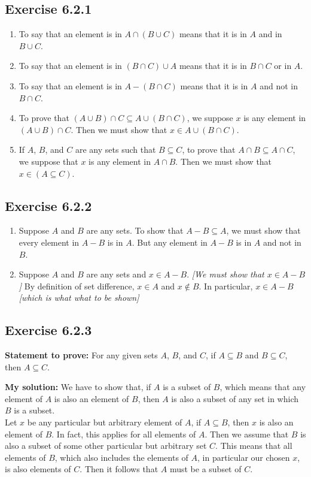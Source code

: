 \documentclass{article}
\newcommand{\In}{\! \in \!}
\newcommand{\Prove}{\textbf{Statement to prove: }}
\newcommand{\Solution}{\textbf{My solution: }}
\newcommand{\QED}{\boxed{}}
\newcommand{\Exercise}[1]{\subsection*{Exercise #1}}
\begin{document}
	\Exercise{6.2.1}
	
	\begin{enumerate}[label=\textbf{\alph*.}]
		\item To say that an element is in $A \cap (B \cup C)$ means that it is in $A$ and in $B \cup C$.
		
		\item To say that an element is in $(B \cap C) \cup A$ means that it is in $B \cap C$ or in $A$.
		
		\item To say that an element is in $A - (B \cap C)$ means that it is in $A$ and not in $B\cap C$.
		
		\item To prove  that $(A \cup B) \cap C \subseteq A \cup (B \cap C )$, we suppose $x$ is any element in $(A \cup B) \cap C$. Then we must show that $x \In A \cup (B \cap C )$.
		
		\item If $A$, $B$, and $C$  are any sets such that $B \subseteq C$, to prove that $A \cap B \subseteq A \cap C$, we suppose that $x$ is any element in $A \cap B$. Then we must show  that $x \In (A \subseteq C)$.
	\end{enumerate}
	
	\Exercise{6.2.2}
	
	\begin{enumerate}[label=\textbf{\alph*.}]
		\item Suppose $A$ and $B$ are any sets. To show that $A-B \subseteq A$, we must show that every element in $A-B$ is in $A$. But any element in $A-B$ is in $A$ and not in $B$.
		
		\item Suppose $A$ and $B$ are any sets and $x\In A-B$. \textit{[We must show that $x \In A-B$]} By definition of set difference, $x \In A$ and $x \notin B$. In particular, $x \In A - B$ \textit{[which is what what to be shown]}
	\end{enumerate}

	\Exercise{6.2.3}
	
	\Prove
	For any given sets $A$, $B$, and $C$, if $A \subseteq B$ and $B \subseteq C$, then $A \subseteq C$. 
	
	\Solution
	We have to show that, if $A$ is a subset of  $B$, which means that any element of $A$ is also an element of $B$, then $A$ is also a subset of any set in which $B$ is a subset.\\
	
	Let $x$ be any particular but arbitrary element of $A$, if $A \subseteq B$, then $x$ is also an element of $B$.  In fact, this applies for all elements of $A$. Then we assume that $B$ is also a subset of some other particular but arbitrary set $C$. This means that all elements of $B$, which also includes the elements of $A$, in particular our chosen $x$, is also elements of $C$. Then it follows that $A$ must be a subset of $C$.\\
	\QED 
	
\end{document}
